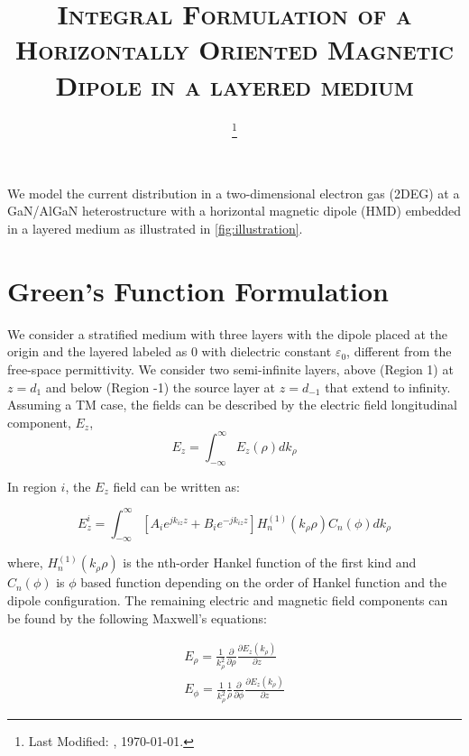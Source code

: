\documentclass{article}
\begin{document}
  \title{\textsc{Integral Formulation of a Horizontally Oriented Magnetic Dipole in a layered medium}\\}
  \date{\footnote{Last Modified: \currenttime, \today.}}
  \maketitle

  We model the current distribution in a two-dimensional electron gas (2DEG) at a GaN/AlGaN heterostructure with a horizontal magnetic dipole (HMD) embedded in a layered medium as illustrated in \ref{fig:illustration}.
  \section{Green's Function Formulation}

  We consider a stratified medium with three layers with the dipole placed at the origin and the layered labeled as $0$ with dielectric constant $\varepsilon_0$, different from the free-space permittivity. We consider two semi-infinite layers, above (Region 1) at $z=d_1$ and below (Region -1) the source layer at $z=d_{-1}$ that extend to infinity. Assuming a TM case, the fields can be described by the electric field longitudinal component, $E_z$,
  \begin{equation}
    E_z = \int_{-\infty}^{\infty} E_z(\rho) dk_{\rho}
    \label{eq:Ez}
  \end{equation}

  In region $i$, the $E_z$ field can be written as:

  \begin{equation}
    E_z^i = \int_{-\infty}^{\infty} \left[ A_i e^{j k_{iz}z} + B_i e^{-j k_{iz}z} \right] H_n^{(1)}(k_{\rho}\rho) C_n(\phi) dk_{\rho}
    \label{eq:TM_Ez}
  \end{equation}

  where, $H_n^{(1)}(k_{\rho}\rho)$ is the nth-order Hankel function of the first kind and $C_n(\phi)$ is $\phi$ based function depending on the order of Hankel function and the dipole configuration. The remaining electric and magnetic field components can be found by the following Maxwell's equations:

  \begin{subequations}
    \begin{align}
      E_{\rho} =  \frac{1}{k_{\rho}^2} \frac{\partial}{\partial \rho} \frac{\partial E_z(k_\rho)}{\partial z}
      \label{eq:E_rho} \\
      E_{\phi} =  \frac{1}{k_{\rho}^2} \frac{1}{\rho} \frac{\partial}{ \partial \phi} \frac{\partial E_z(k_\rho)}{\partial z}
      \label{eq:E_phi}
    \end{align}
    \label{eq:E_fields}
  \end{subequations}
\end{document}
